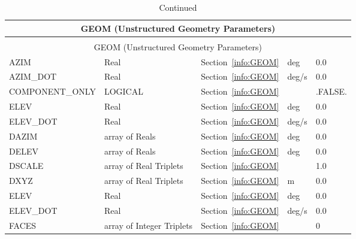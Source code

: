 \documentclass[12pt]{article}
\begin{document}
\begin{longtable}{@{\extracolsep{\fill}}|l|l|l|l|l|}
\caption[Unstructured geometry parameters ({\ct GEOM} namelist group)]{For more information see Section~\ref{info:GEOM}.}
\label{tbl:GEOM} \\
\hline
\multicolumn{5}{|c|}{{\ct GEOM} (Unstructured Geometry Parameters)} \\
\hline \hline
\endfirsthead
\caption[]{Continued} \\
\hline
\multicolumn{5}{|c|}{{\ct GEOM} (Unstructured Geometry Parameters)} \\
\hline \hline
\endhead
{\ct AZIM}         & Real                   & Section~\ref{info:GEOM}            &  deg      &    0.0                   \\ \hline
{\ct AZIM\_DOT}    & Real                   & Section~\ref{info:GEOM}            &  deg/s    &    0.0                   \\ \hline
{\ct COMPONENT\_ONLY} & LOGICAL             & Section~\ref{info:GEOM}            &           &  {\ct .FALSE.}           \\ \hline
{\ct ELEV}         & Real                   & Section~\ref{info:GEOM}            &  deg      &    0.0                   \\ \hline
{\ct ELEV\_DOT}    & Real                   & Section~\ref{info:GEOM}            &  deg/s    &    0.0                   \\ \hline
{\ct DAZIM}        & array of Reals         & Section~\ref{info:GEOM}            &  deg      &    0.0                   \\ \hline
{\ct DELEV}        & array of Reals         & Section~\ref{info:GEOM}            &  deg      &    0.0                   \\ \hline
{\ct DSCALE}       & array of Real Triplets & Section~\ref{info:GEOM}            &           &   1.0                    \\ \hline
{\ct DXYZ}         & array of Real Triplets & Section~\ref{info:GEOM}            &   m       &   0.0                    \\ \hline
{\ct ELEV}         & Real                   & Section~\ref{info:GEOM}            &  deg      &    0.0                   \\ \hline
{\ct ELEV\_DOT}    & Real                   & Section~\ref{info:GEOM}            &  deg/s    &    0.0                   \\ \hline
{\ct FACES}        & array of Integer Triplets     & Section~\ref{info:GEOM}     &           &    0                     \\ \hline

\end{longtable}
\end{document}
